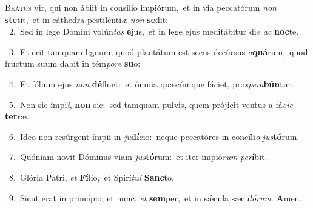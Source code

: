 \lettrine{\initial\textcolor{\initialcolor}{B}}{eátus} vir, qui non ábiit in consílio impiórum,~\dagger et in via peccatórum \textit{non} \textbf{ste}\-tit,~\star et in cáthedra pestilénti\textit{æ} \textit{non} \textbf{se}\-dit:\\
{\numbfont\textcolor{\numbcolor}{~2.}}~Sed in lege Dómini volún\textit{tas} \textbf{e}\-jus,~\star et in lege ejus meditábitur di\textit{e} \textit{ac} \textbf{noc}\-te.\par
{\numbfont\textcolor{\numbcolor}{~3.}}~Et erit tamquam lignum, quod plantátum est secus decúrsus \textit{a}\-\textbf{quá}rum,~\star quod fructum suum dabit in tém\-\textit{po}\-\textit{re} \textbf{su}\-o:\par
{\numbfont\textcolor{\numbcolor}{~4.}}~Et fólium ejus \textit{non} \textbf{dé}\-fluet:~\star et ómnia quæcúmque fáciet, pro\-\textit{spe}\-\textit{ra}\textbf{bún}tur.\par
{\numbfont\textcolor{\numbcolor}{~5.}}~Non sic ímpi\-\textit{i}\-, \textbf{non} sic:~\star sed tamquam pulvis, quem prójicit ventus a fá\-\textit{ci}\-\textit{e} \textbf{ter}\-ræ.\par
{\numbfont\textcolor{\numbcolor}{~6.}}~Ideo non resúrgent ímpii in \textit{ju}\-\textbf{dí}cio:~\star neque peccatóres in concíli\textit{o} \textit{jus}\-\textbf{tó}rum.\par
{\numbfont\textcolor{\numbcolor}{~7.}}~Quóniam novit Dóminus viam \textit{jus}\-\textbf{tó}rum:~\star et iter impió\textit{rum} \textit{per}\-\textbf{í}bit.\par
{\numbfont\textcolor{\numbcolor}{~8.}}~Glória Patri, \textit{et} \textbf{Fí}\-lio,~\star et Spirí\-\textit{tu}\-\textit{i} \textbf{Sanc}\-to.\par
{\numbfont\textcolor{\numbcolor}{~9.}}~Sicut erat in princípio, et nunc, \textit{et} \textbf{sem}\-per,~\star et in sǽcula sæcu\-\textit{ló}\-\textit{rum}. \textbf{A}\-men.\par
